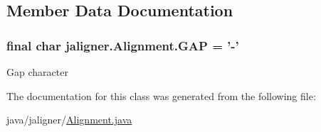 \subsection{Member Data Documentation}
\hypertarget{classjaligner_1_1_alignment_a5578c8eb1e46b49cba1ba8745a1c9726}{
\subsubsection[{G\+A\+P}]{\setlength{\rightskip}{0pt plus 5cm}final char jaligner.\+Alignment.\+G\+A\+P = '-\/'\hspace{0.3cm}{\ttfamily [static]}}}\label{classjaligner_1_1_alignment_a5578c8eb1e46b49cba1ba8745a1c9726}
Gap character 

The documentation for this class was generated from the following file\+:\begin{DoxyCompactItemize}
\item 
java/jaligner/\hyperlink{jaligner_2_alignment_8java}{Alignment.\+java}\end{DoxyCompactItemize}

